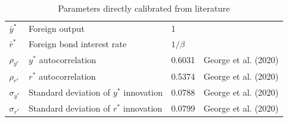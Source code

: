 \documentclass[12pt]{article}
\begin{document}
\begin{table}[h!]
\begin{tabular}{llll}
$\bar{y}^*$  & Foreign output    & 1                                                            \\
$\bar{r}^*$   & Foreign bond interest rate           & $1/\beta$                                   \\
$\rho_{y^*}$  & $y^*$ autocorrelation  & 0.6031   &       George et al. (2020)                                \\
$\rho_{r^*}$   & $r^*$ autocorrelation  & 0.5374     &       George et al. (2020)                                \\
$\sigma_{y^*}$  & Standard deviation of $y^*$ innovation   & 0.0788    &       George et al. (2020)                                \\
$\sigma_{r^*}$  & Standard deviation of $r^*$ innovation & 0.0799    &       George et al. (2020)                                \\\hline
\end{tabular}
\caption{Parameters directly calibrated from literature}
\end{table}
\end{document}
